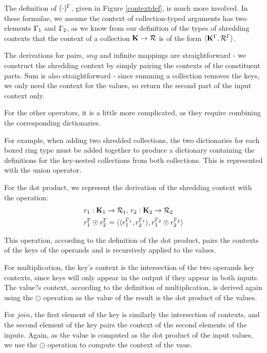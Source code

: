 {{{The definition of $(\cdot)^\Gamma$, given in Figure \ref{contextdef}, is much more involved. In these formulae, we assume the context of collection-typed arguments has two elements $\Gamma_1$ and $\Gamma_2$, as we know from our definition of the types of shredding contexts that the context of a collection $\mathbf{K} \rightarrow \mathcal{R}$ is of the form $\langle \mathbf{K}^\Gamma, \mathcal{R}^\Gamma \rangle$.

The derivations for pairs, $sng$ and infinite mappings are straightforward - we construct the shredding context by simply pairing the contexts of the constituent parts. Sum is also straightforward - since summing a collection removes the keys, we only need the context for the values, so return the second part of the input context only.

For the other operators, it is a little more complicated, as they require combining the corresponding dictionaries.

For example, when adding two shredded collections, the two dictionaries for each boxed ring type must be added together to produce a dictionary containing the definitions for the key-nested collections from both collections. This is represented with the union operator.

For the dot product, we represent the derivation of the shredding context with the operation:
\begin{equation*}
\begin{split}
&r_1: \mathbf{K}_1 \rightarrow \mathcal{R}_1\textrm{, }r_2: \mathbf{K}_2 \rightarrow \mathcal{R}_2 \\
&r_1^\Gamma \odot r_2^\Gamma = \langle \langle r_1^{\Gamma_1}, r_2^{\Gamma_1} \rangle, r_1^{\Gamma_2} \odot r_2^{\Gamma_2} \rangle
\end{split}
\end{equation*}

This operation, according to the definition of the dot product, pairs the contexts of the keys of the operands and is recursively applied to the values.

For multiplication, the key's context is the intersection of the two operands key contexts, since keys will only appear in the output if they appear in both inputs. The value?s context, according to the definition of multiplication, is derived again using the $\odot$ operation as the value of the result is the dot product of the values.

For $join$, the first element of the key is similarly the intersection of contexts, and the second element of the key pairs the context of the second elements of the inputs. Again, as the value is computed as the dot product of the input values, we use the $\odot$ operation to compute the context of the vaue.

}}}
